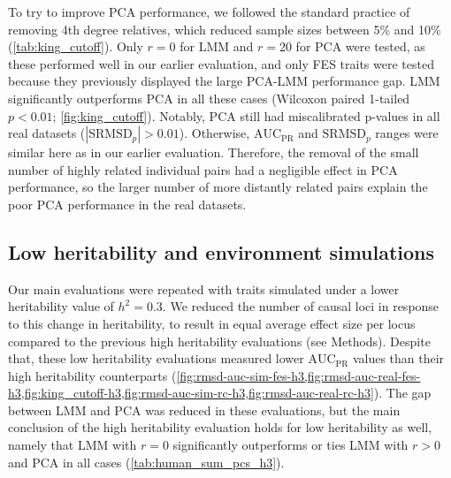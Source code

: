 \documentclass[11pt]{article}
\newcommand{\rmsd}{\text{SRMSD}_p}
\newcommand{\auc}{\text{AUC}_\text{PR}}
\begin{document}
\begin{linenumbers}
To try to improve PCA performance, we followed the standard practice of removing 4th degree relatives, which reduced sample sizes between 5\% and 10\% (\cref{tab:king_cutoff}).
Only $r=0$ for LMM and $r=20$ for PCA were tested, as these performed well in our earlier evaluation, and only FES traits were tested because they previously displayed the large PCA-LMM performance gap.
LMM significantly outperforms PCA in all these cases (Wilcoxon paired 1-tailed $p < 0.01$; \cref{fig:king_cutoff}).
Notably, PCA still had miscalibrated p-values in all real datasets ($|\rmsd| > 0.01$).
Otherwise, $\auc$ and $\rmsd$ ranges were similar here as in our earlier evaluation.
Therefore, the removal of the small number of highly related individual pairs had a negligible effect in PCA performance, so the larger number of more distantly related pairs explain the poor PCA performance in the real datasets.


\subsection{Low heritability and environment simulations}

Our main evaluations were repeated with traits simulated under a lower heritability value of $h^2 = 0.3$.
We reduced the number of causal loci in response to this change in heritability, to result in equal average effect size per locus compared to the previous high heritability evaluations (see Methods).
Despite that, these low heritability evaluations measured lower $\auc$ values than their high heritability counterparts (\cref{fig:rmsd-auc-sim-fes-h3,fig:rmsd-auc-real-fes-h3,fig:king_cutoff-h3,fig:rmsd-auc-sim-rc-h3,fig:rmsd-auc-real-rc-h3}).
The gap between LMM and PCA was reduced in these evaluations, but the main conclusion of the high heritability evaluation holds for low heritability as well, namely that LMM with $r=0$ significantly outperforms or ties LMM with $r > 0$ and PCA in all cases (\cref{tab:human_sum_pcs_h3}).


\end{linenumbers}
\end{document}
